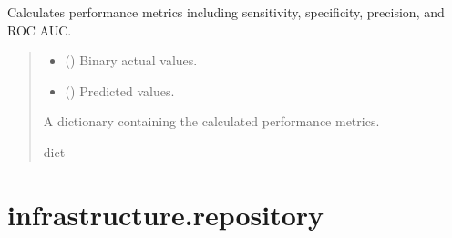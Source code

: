 \documentclass[letterpaper,10pt,english]{sphinxmanual}
\begin{document}
\begin{fulllineitems}
\label{\detokenize{modules:domain.services.metrics.performance_metrics}}
\pysigstartsignatures
{}
\pysigstopsignatures
\sphinxAtStartPar
Calculates performance metrics including sensitivity, specificity, precision, and ROC AUC.
\begin{quote}\begin{description}
\begin{itemize}
\item {} 
\sphinxAtStartPar
{} () \textendash{} Binary actual values.

\item {} 
\sphinxAtStartPar
{} () \textendash{} Predicted values.

\end{itemize}

\sphinxAtStartPar
A dictionary containing the calculated performance metrics.

\sphinxAtStartPar
dict

\end{description}\end{quote}

\end{fulllineitems}



\section{infrastructure.repository}
\label{\detokenize{modules:module-infrastructure.repository.ReportInFile}}\label{\detokenize{modules:infrastructure-repository}}
\end{document}
